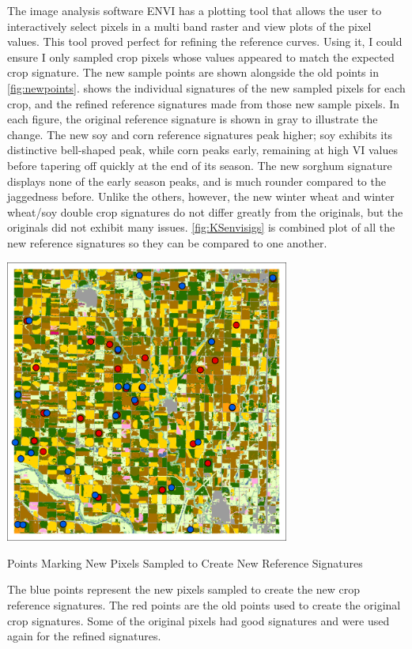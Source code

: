 The image analysis software ENVI \autocite{envi5.0} has a plotting tool that allows the user to interactively select pixels in a multi band raster and view plots of the pixel values. This tool proved perfect for refining the reference curves. Using it, I could ensure I only sampled crop pixels whose values appeared to match the expected crop signature. The new sample points are shown alongside the old points in \autoref{fig:newpoints}.  shows the individual signatures of the new sampled pixels for each crop, and the refined reference signatures made from those new sample pixels. In each figure, the original reference signature is shown in gray to illustrate the change. The new soy and corn reference signatures peak higher; soy exhibits its distinctive bell-shaped peak, while corn peaks early, remaining at high VI values before tapering off quickly at the end of its season. The new sorghum signature displays none of the early season peaks, and is much rounder compared to the jaggedness before. Unlike the others, however, the new winter wheat and winter wheat/soy double crop signatures do not differ greatly from the originals, but the originals did not exhibit many issues. \autoref{fig:KSenvisigs} is combined plot of all the new reference signatures so they can be compared to one another.

\begin{ssfigure}
  \centering
  \includegraphics[width=0.7\textwidth]{Graphics/Testing/clip1_MODIS_CDL_smpl_old_wnew.pdf}
  \caption{Points Marking New Pixels Sampled to Create New Reference Signatures}
  \label{fig:newpoints}
  \medskip
  \small
  The blue points represent the new pixels sampled to create the new crop reference signatures. The red points are the old points used to create the original crop signatures. Some of the original pixels had good signatures and were used again for the refined signatures.
\end{ssfigure}


